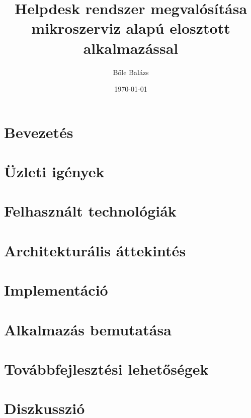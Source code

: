 


\title{\foreignlanguage{british}{Helpdesk} rendszer megvalósítása mikroszerviz alapú elosztott alkalmazással}
\author{Bőle Balázs}
\date{\today}
\graphicspath{{Figs/}}  %


\sloppy
{}
\makeatletter  %

\makeatother

\clearpage


\pagestyle{front}
\tableofcontents

\begingroup
\let\clearpage\relax
\listoffigures
\endgroup


\clearpage
{}
\chapter*{Bevezetés}\label{ch:bevezetes}



\chapter{Üzleti igények}\label{ch:uzleti_igenyek}
\pagestyle{main}



\chapter[Technológiai áttekintés]{Felhasznált technológiák}\label{ch:felhasznalt_technologiak}
\pagestyle{main}



\chapter{Architekturális áttekintés}
\pagestyle{main}



\chapter{Implementáció}
\pagestyle{main}



\chapter{Alkalmazás bemutatása}
\pagestyle{main}



\chapter{Továbbfejlesztési lehetőségek}
\pagestyle{main}



\chapter*{Diszkusszió}\label{ch:diszkusszió}
\pagestyle{plain}


\newpage








